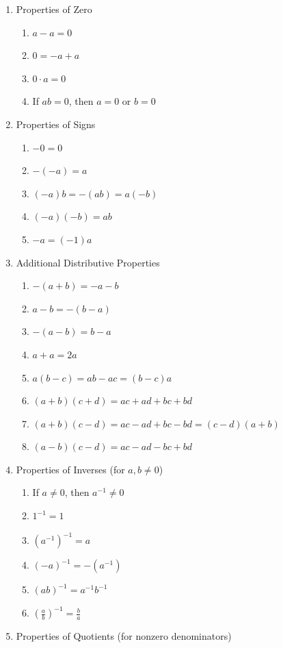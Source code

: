 \documentclass[
]{book}
\providecommand{\tightlist}{%
  \setlength{\itemsep}{0pt}\setlength{\parskip}{0pt}}
\theoremstyle{definition}
\theoremstyle{definition}
\theoremstyle{definition}
\theoremstyle{definition}
\theoremstyle{remark}
\begin{document}
\begin{enumerate}
\def\labelenumi{\arabic{enumi}.}
\item
  Properties of Zero

  \begin{enumerate}
  \def\labelenumii{\alph{enumii}.}
  \tightlist
  \item
    \(a - a = 0\)
  \item
    \(0 = -a + a\)
  \item
    \(0 \cdot a = 0\)
  \item
    If \(ab = 0\), then \(a = 0\) or \(b = 0\)
  \end{enumerate}
\item
  Properties of Signs

  \begin{enumerate}
  \def\labelenumii{\alph{enumii}.}
  \tightlist
  \item
    \(-0 = 0\)
  \item
    \(-(-a) = a\)
  \item
    \((-a)b = -(ab) = a(-b)\)
  \item
    \((-a)(-b) = ab\)
  \item
    \(-a = (-1)a\)
  \end{enumerate}
\item
  Additional Distributive Properties

  \begin{enumerate}
  \def\labelenumii{\alph{enumii}.}
  \tightlist
  \item
    \(-(a + b) = -a - b\)
  \item
    \(a - b = -(b - a)\)
  \item
    \(-(a - b) = b - a\)
  \item
    \(a + a = 2a\)
  \item
    \(a(b - c) = ab - ac = (b - c)a\)
  \item
    \((a + b)(c + d) = ac + ad + bc + bd\)
  \item
    \((a + b)(c - d) = ac - ad + bc - bd = (c - d)(a + b)\)
  \item
    \((a - b)(c - d) = ac - ad - bc + bd\)
  \end{enumerate}
\item
  Properties of Inverses (for \(a, b \ne 0\))

  \begin{enumerate}
  \def\labelenumii{\alph{enumii}.}
  \tightlist
  \item
    If \(a \ne 0\), then \(a^{-1} \ne 0\)
  \item
    \(1^{-1} = 1\)
  \item
    \((a^{-1})^{-1} = a\)
  \item
    \((-a)^{-1} = -(a^{-1})\)
  \item
    \((ab)^{-1} = a^{-1}b^{-1}\)
  \item
    \(\left( \frac{a}{b} \right)^{-1} = \frac{b}{a}\)
  \end{enumerate}
\item
  Properties of Quotients (for nonzero denominators)


\end{enumerate}
\end{document}
